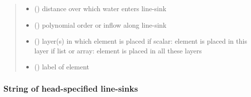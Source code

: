 \documentclass[letterpaper,10pt,english]{sphinxmanual}
\begin{document}
\begin{fulllineitems}
\begin{quote}
\begin{description}
\begin{itemize}
\item {} 
 () \textendash{} distance over which water enters line-sink

\item {} 
 (\sphinxstyleliteralemphasis{ (}\sphinxstyleliteralemphasis{)}) \textendash{} polynomial order or inflow along line-sink

\item {} 
 (\sphinxstyleliteralemphasis{, }) \textendash{} layer(s) in which element is placed
if scalar: element is placed in this layer
if list or array: element is placed in all these layers

\item {} 
 () \textendash{} label of element

\end{itemize}

\end{description}\end{quote}




{\hyperref[\detokenize{linesinks/headlinesinkstring:timml.linesink.HeadLineSinkString}]{}}



\end{fulllineitems}



\subsubsection{String of head-specified line-sinks}
\label{\detokenize{linesinks/headlinesinkstring:string-of-head-specified-line-sinks}}\label{\detokenize{linesinks/headlinesinkstring::doc}}
\end{document}
